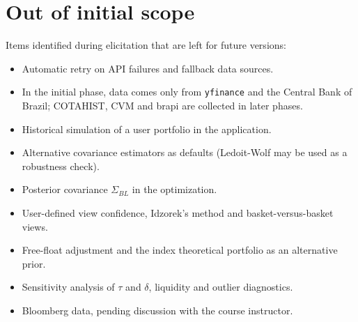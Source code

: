 \section{Out of initial scope}
Items identified during elicitation that are left for future versions:
\begin{itemize}
  \item Automatic retry on API failures and fallback data sources.
  \item In the initial phase, data comes only from \texttt{yfinance} and the Central Bank of Brazil; COTAHIST, CVM and brapi are collected in later phases.
  \item Historical simulation of a user portfolio in the application.
  \item Alternative covariance estimators as defaults (Ledoit-Wolf may be used as a robustness check).
  \item Posterior covariance $\Sigma_{BL}$ in the optimization.
  \item User-defined view confidence, Idzorek's method and basket-versus-basket views.
  \item Free-float adjustment and the index theoretical portfolio as an alternative prior.
  \item Sensitivity analysis of $\tau$ and $\delta$, liquidity and outlier diagnostics.
  \item Bloomberg data, pending discussion with the course instructor.
\end{itemize}
